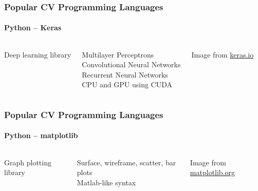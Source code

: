\documentclass[xetex,professionalfont]{beamer}
\begin{document}

\begin{frame}
\frametitle{Popular CV Programming Languages}
\framesubtitle{Python -- Keras}

\begin{columns}

Deep learning library

\medskip
Multilayer Perceptrons \\
Convolutional Neural Networks \\
Recurrent Neural Networks \\
CPU and GPU using CUDA


\begin{center}
{
	{\centering Image from \url{keras.io}}}
\end{center}

\end{columns}

\end{frame}


\begin{frame}
\frametitle{Popular CV Programming Languages}
\framesubtitle{Python -- matplotlib}

\begin{columns}

Graph plotting library

\medskip
Surface, wireframe, scatter, bar plots\\
Matlab-like syntax


\begin{center}
{
	{\centering Image from \url{matplotlib.org}}}
\end{center}

\end{columns}

\end{frame}
\end{document}
